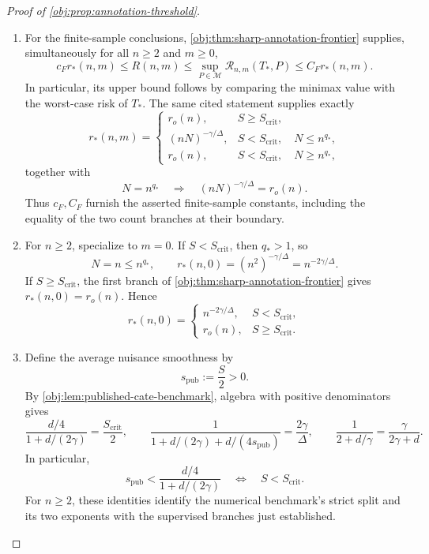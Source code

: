 \documentclass[11pt]{article}
\begin{document}
\begin{proof}[Proof of \cref{obj:prop:annotation-threshold}]
\begin{enumerate}
\item
For the finite-sample conclusions,
\cref{obj:thm:sharp-annotation-frontier} supplies, simultaneously for all \(n\ge2\) and \(m\ge0\),
\[
c_F r_*(n,m)\le R(n,m)
\le\sup_{P\in\mathcal M}\mathcal R_{n,m}(T_*,P)
\le C_F r_*(n,m).
\]
In particular, its upper bound follows by comparing the minimax value with the worst-case risk of \(T_*\). The same cited statement supplies exactly
\[
r_*(n,m)=
\begin{cases}
r_o(n),&S\ge S_{\mathrm{crit}},\\
(nN)^{-\gamma/\Delta},
&S<S_{\mathrm{crit}},\quad N\le n^{q_*},\\
r_o(n),
&S<S_{\mathrm{crit}},\quad N\ge n^{q_*},
\end{cases}
\]
together with
\[
N=n^{q_*}
\quad\Longrightarrow\quad
(nN)^{-\gamma/\Delta}=r_o(n).
\]
Thus \(c_F,C_F\) furnish the asserted finite-sample constants, including the equality of the two count branches at their boundary.

\item
For \(n\ge2\), specialize to \(m=0\). If \(S<S_{\mathrm{crit}}\), then \(q_*>1\), so
\[
N=n\le n^{q_*},
\qquad
r_*(n,0)=(n^2)^{-\gamma/\Delta}
=n^{-2\gamma/\Delta}.
\]
If \(S\ge S_{\mathrm{crit}}\), the first branch of
\cref{obj:thm:sharp-annotation-frontier} gives \(r_*(n,0)=r_o(n)\). Hence
\[
r_*(n,0)=
\begin{cases}
n^{-2\gamma/\Delta},&S<S_{\mathrm{crit}},\\
r_o(n),&S\ge S_{\mathrm{crit}}.
\end{cases}
\]

\item
Define the average nuisance smoothness by
\[
s_{\mathrm{pub}}:=\frac S2>0.
\]
By \cref{obj:lem:published-cate-benchmark}, algebra with positive denominators gives
\[
\frac{d/4}{1+d/(2\gamma)}
=\frac{S_{\mathrm{crit}}}{2},
\qquad
\frac{1}{1+d/(2\gamma)+d/(4s_{\mathrm{pub}})}
=\frac{2\gamma}{\Delta},
\qquad
\frac{1}{2+d/\gamma}
=\frac{\gamma}{2\gamma+d}.
\]
In particular,
\[
s_{\mathrm{pub}}<\frac{d/4}{1+d/(2\gamma)}
\quad\Longleftrightarrow\quad
S<S_{\mathrm{crit}}.
\]
For \(n\ge2\), these identities identify the numerical benchmark's strict split and its two exponents with the supervised branches just established.


\end{enumerate}
\end{proof}
\end{document}
